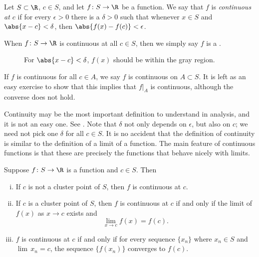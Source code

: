 \documentclass[12pt]{book}
\begin{document}
\begin{defn}
Let $S \subset \R$, $c \in S$, and let $f \colon S \to \R$ be a function.
We say
that $f$ is \emph{continuous at $c$}
if for every $\epsilon > 0$
there is a $\delta > 0$ such that whenever $x \in S$ and $\abs{x-c} <
\delta$, then
$\abs{f(x)-f(c)} < \epsilon$.


When $f \colon S \to \R$ is continuous at all $c \in S$, then we simply say
$f$ is a \emph{}.
\end{defn}
\begin{figure}[h!t]
\begin{center}

\caption{For $\abs{x-c} < \delta$, $f(x)$ should be within the gray region.\label{fig:contigr}}
\end{center}
\end{figure}

If $f$ is continuous for all $c \in A$, we say
$f$ is continuous on $A \subset S$.
It is left as an easy exercise to
show that this implies that $f|_A$ is continuous, although
the converse does not hold.

Continuity may be the most important definition to understand in analysis,
and it is not an easy one.
See .
Note that $\delta$ not only
depends on $\epsilon$, but also on $c$;  we need not pick
one $\delta$ for all $c \in S$.
It is no accident 
that the definition of continuity is similar to the definition of a
limit of a function.
The main feature of continuous functions
is that these are precisely the functions that behave nicely with limits.

\enlargethispage{\baselineskip}
\begin{prop} \label{contbasic:prop}
Suppose $f \colon S \to \R$ is a function and $c \in S$.
Then
\begin{enumerate}[(i)]
\item If $c$ is not a cluster point of $S$, then $f$ is continuous at $c$.
\item If $c$ is a cluster point of $S$, then $f$ is continuous at $c$
if and only if the limit of $f(x)$ as $x \to c$ exists and
\begin{equation*}
\lim_{x\to c} f(x) = f(c) .
\end{equation*}
\item $f$ is continuous at $c$ if and only if for every sequence $\{ x_n \}$
where $x_n \in S$ and $\lim\, x_n = c$, the sequence $\{ f(x_n) \}$ converges
to $f(c)$.
\end{enumerate}
\end{prop}
\end{document}

